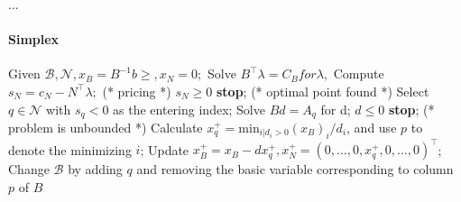 
...

\sepline

\paragraph{Simplex}

\begin{codebox}
\li Given $\mathcal{B}, \mathcal{N}, x_B = B^{-1}b \geq, x_N = 0;$
\li Solve $B^\top \lambda = C_B for \lambda,$
\li Compute $s_N = c_N - N^\top \lambda;$ (* pricing *)
\li \If $s_N \geq 0$ \Indentmore
\li \textbf{stop}; (* optimal point found *) \End
\li Select $q \in \mathcal{N}$ with $s_q < 0$ as the entering index;
\li Solve $Bd = A_q$ for d;
\li \If $d \leq 0$ \Indentmore
\li \textbf{stop}; (* problem is unbounded *) \End
\li Calculate $x_q^+ = \text{min}_{i | d_i > 0} (x_B)_i/d_i$, and use $p$ to
\zi denote the minimizing $i$;
\li Update $x_B^+ = x_B - dx_q^+, x_N^+ = (0, \dots, 0, x_q^+, 0, \dots, 0)^\top$;
\li Change $\mathcal{B}$ by adding $q$ and removing the basic
\zi variable corresponding to column $p$ of $B$
\end{codebox}
